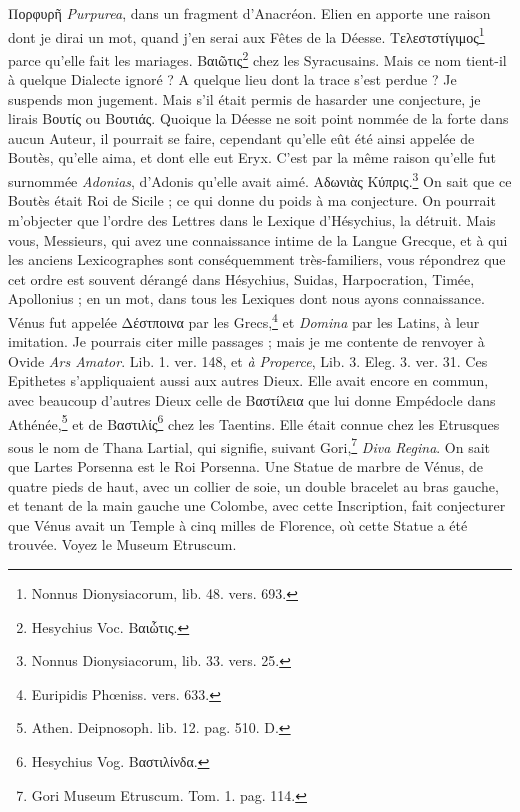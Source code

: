 \documentclass[a4paper, 18pt, oneside]{article}
\begin{document}
Πορφυρῆ \emph{Purpurea}, dans un fragment d'Anacréon. Elien en apporte une raison dont je dirai un mot, quand j'en serai aux Fêtes de la Déesse. Τελεστστίγιμος\footnote{Nonnus Dionysiacorum, lib. 48. vers. 693.} parce qu'elle fait les mariages. Βαιῶτις\footnote{Hesychius Voc. Βαιὧτις.} chez les Syracusains. Mais ce nom tient-il à quelque Dialecte ignoré ? A quelque lieu dont la trace s'est perdue ? Je suspends mon jugement. Mais s'il était permis de hasarder une conjecture, je lirais Βουτίς ou Βουτιάς. Quoique la Déesse ne soit point nommée de la forte dans aucun Auteur, il pourrait se faire, cependant qu'elle eût été ainsi appelée de Boutès, qu'elle aima, et dont elle eut Eryx. C'est par la même raison qu'elle fut surnommée \emph{Adonias}, d'Adonis qu'elle avait aimé. Αδωνιὰς Κύπρις.\footnote{Nonnus Dionysiacorum, lib. 33. vers. 25.} On sait que ce Boutès était Roi de Sicile ; ce qui donne du poids à ma conjecture. On pourrait m'objecter que l'ordre des Lettres dans le Lexique d'Hésychius, la détruit. Mais vous, Messieurs, qui avez une connaissance intime de la Langue Grecque, et à qui les anciens Lexicographes sont conséquemment très-familiers, vous répondrez que cet ordre est souvent dérangé dans Hésychius, Suidas, Harpocration, Timée, Apollonius ; en un mot, dans tous les Lexiques dont nous ayons connaissance. Vénus fut appelée Δέστποινα par les Grecs,\footnote{Euripidis Phœniss. vers. 633.} et \emph{Domina} par les Latins, à leur imitation. Je pourrais citer mille passages ; mais je me contente de renvoyer à Ovide \emph{Ars Amator}. Lib. 1. ver. 148, et \emph{à Properce}, Lib. 3. Eleg. 3. ver. 31. Ces Epithetes s'appliquaient aussi aux autres Dieux. Elle avait encore en commun, avec beaucoup d'autres Dieux celle de Βαστίλεια que lui donne Empédocle dans Athénée,\footnote{Athen. Deipnosoph. lib. 12. pag. 510. D.} et de Βαστιλίς\footnote{Hesychius Vog. Βαστιλίνδα.} chez les Taentins. Elle était connue chez les Etrusques sous le nom de Thana Lartial, qui signifie, suivant Gori,\footnote{Gori Museum Etruscum. Tom. 1. pag. 114.} \emph{Diva Regina}. On sait que Lartes Porsenna est le Roi Porsenna. Une Statue de marbre de Vénus, de quatre pieds de haut, avec un collier de soie, un double bracelet au bras gauche, et tenant de la main gauche une Colombe, avec cette Inscription, fait conjecturer que Vénus avait un Temple à cinq milles de Florence, où cette Statue a été trouvée. Voyez le Museum Etruscum.
\end{document}
